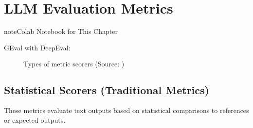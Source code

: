 \documentclass[letterpaper,11pt,english]{sphinxmanual}
\begin{document}
\sphinxstepscope


\chapter{LLM Evaluation Metrics}
\label{\detokenize{evaluation:llm-evaluation-metrics}}\label{\detokenize{evaluation:evaluation}}\label{\detokenize{evaluation::doc}}
\begin{sphinxadmonition}{note}{Colab Notebook for This Chapter}

\sphinxAtStartPar
GEval with DeepEval: 
\end{sphinxadmonition}

\begin{figure}[htbp]
\centering
\capstart

\noindent{}
\caption{Types of metric scorers (Source: )}\label{\detokenize{evaluation:id3}}\label{\detokenize{evaluation:fig-metrics-llm}}\end{figure}


\section{Statistical Scorers (Traditional Metrics)}
\label{\detokenize{evaluation:statistical-scorers-traditional-metrics}}
\sphinxAtStartPar
These metrics evaluate text outputs based on statistical comparisons to references
or expected outputs.
\end{document}
